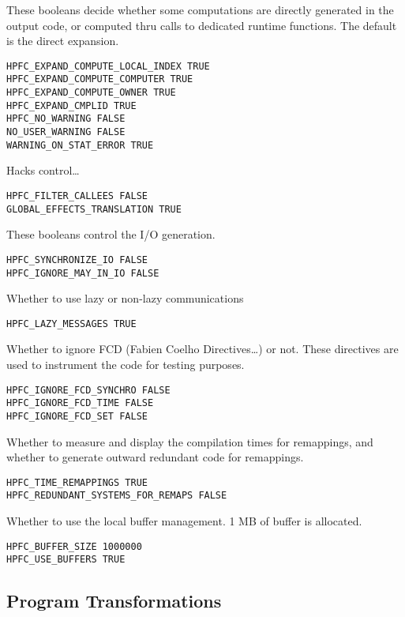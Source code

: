   These booleans decide whether some computations are directly
generated in the output code, or computed thru calls to dedicated
runtime functions. The default is the direct expansion.

\begin{verbatim}
HPFC_EXPAND_COMPUTE_LOCAL_INDEX TRUE
HPFC_EXPAND_COMPUTE_COMPUTER TRUE
HPFC_EXPAND_COMPUTE_OWNER TRUE
HPFC_EXPAND_CMPLID TRUE
HPFC_NO_WARNING FALSE
NO_USER_WARNING FALSE
WARNING_ON_STAT_ERROR TRUE
\end{verbatim}

   Hacks control\ldots

\begin{verbatim}
HPFC_FILTER_CALLEES FALSE
GLOBAL_EFFECTS_TRANSLATION TRUE
\end{verbatim}

  These booleans control the I/O generation.

\begin{verbatim}
HPFC_SYNCHRONIZE_IO FALSE
HPFC_IGNORE_MAY_IN_IO FALSE
\end{verbatim}

  Whether to use lazy or non-lazy communications

\begin{verbatim}
HPFC_LAZY_MESSAGES TRUE
\end{verbatim}

Whether to ignore FCD (Fabien Coelho Directives\ldots) or not. These
directives are used to instrument the code for testing purposes.

\begin{verbatim}
HPFC_IGNORE_FCD_SYNCHRO FALSE
HPFC_IGNORE_FCD_TIME FALSE
HPFC_IGNORE_FCD_SET FALSE
\end{verbatim}

Whether to measure and display the compilation times for remappings,
and whether to generate outward redundant code for remappings.

\begin{verbatim}
HPFC_TIME_REMAPPINGS TRUE
HPFC_REDUNDANT_SYSTEMS_FOR_REMAPS FALSE
\end{verbatim}

Whether to use the local buffer management. 1 MB of buffer is allocated.

\begin{verbatim}
HPFC_BUFFER_SIZE 1000000
HPFC_USE_BUFFERS TRUE
\end{verbatim}


\subsection{Program Transformations}


